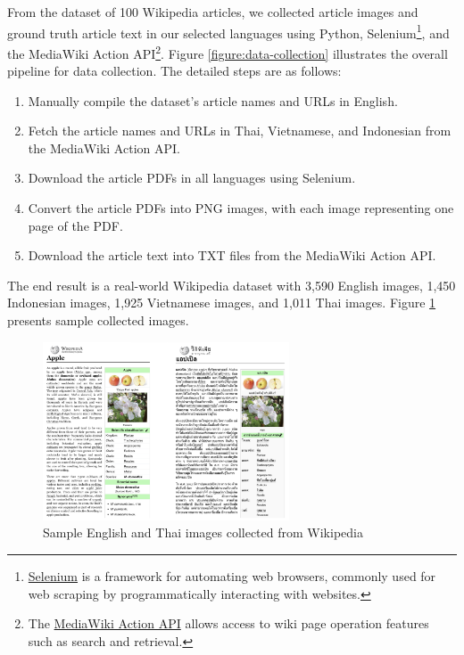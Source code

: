 \documentclass[12pt,oneside]{memoir}
\begin{document}
From the dataset of 100 Wikipedia articles, we collected article images and ground 
truth article text in our selected languages using Python, 
Selenium\footnote{\href{https://selenium-python.readthedocs.io}{Selenium} is a 
framework for automating web browsers, commonly used for web scraping by programmatically 
interacting with websites.}, and the MediaWiki Action API\footnote{The \href{https://www.mediawiki.org/wiki/API:Main_page}{MediaWiki Action API} allows 
access to wiki page operation features such as search and retrieval.}. Figure \ref{figure:data-collection} illustrates the overall pipeline 
for data collection. The detailed steps are as follows:

\begin{enumerate}
    \item Manually compile the dataset’s article names and URLs in English.
    \item Fetch the article names and URLs in Thai, Vietnamese, and Indonesian from the MediaWiki Action API.
    \item Download the article PDFs in all languages using Selenium.
    \item Convert the article PDFs into PNG images, with each image representing one page of the PDF.
    \item Download the article text into TXT files from the MediaWiki Action API.
\end{enumerate}

The end result is a real-world Wikipedia dataset with 3,590 English images, 1,450 Indonesian images, 1,925 Vietnamese images, and 1,011 Thai images.
Figure \ref{figure:real-world-data} presents sample collected images.

\begin{figure}[ht]
    \centering
    \includegraphics[width=0.65\textwidth]{images/real-world-data.png}
    \caption{Sample English and Thai images collected from Wikipedia}
    \label{figure:real-world-data}
\end{figure}
\end{document}
